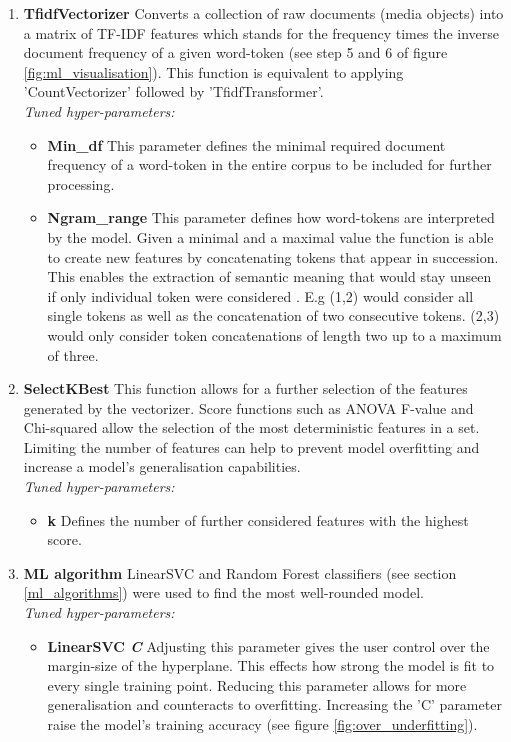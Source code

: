 \begin{enumerate}
    \item \textbf{TfidfVectorizer} Converts a collection of raw documents (media objects) into a matrix of TF-IDF features which stands for the frequency times the inverse document frequency of a given word-token (see step 5 and 6 of figure \ref{fig:ml_visualisation}). This function is equivalent to applying 'CountVectorizer' followed by 'TfidfTransformer'.\\
    \textit{Tuned hyper-parameters:}
    \begin{itemize}[label={}]
        \item \textbf{Min\_df} This parameter defines the minimal required document frequency of a word-token in the entire corpus to be included for further processing.
        \item \textbf{Ngram\_range} This parameter defines how word-tokens are interpreted by the model. Given a minimal and a maximal value the function is able to create new features by concatenating tokens that appear in succession. This enables the extraction of semantic meaning that would stay unseen if only individual token were considered \parencite{Surtikanti2013}. E.g (1,2) would consider all single tokens as well as the concatenation of two consecutive tokens. (2,3) would only consider token concatenations of length two up to a maximum of three.
    \end{itemize}
    
    \item \textbf{SelectKBest} This function allows for a further selection of the features generated by the vectorizer. Score functions such as ANOVA F-value and Chi-squared allow the selection of the most deterministic features in a set. Limiting the number of features can help to prevent model overfitting and increase a model's generalisation capabilities.\\
    \textit{Tuned hyper-parameters:}
    \begin{itemize}[label={}]
        \item \textbf{k} Defines the number of further considered features with the highest score.
    \end{itemize}
    
    \item \textbf{ML algorithm} LinearSVC and Random Forest classifiers (see section \ref{ml_algorithms}) were used to find the most well-rounded model.\\
    \textit{Tuned hyper-parameters:}
    \begin{itemize}[label={}]
        \item \textbf{LinearSVC \textit{C}} Adjusting this parameter gives the user control over the margin-size of the hyperplane. This effects how strong the model is fit to every single training point. Reducing this parameter allows for more generalisation and counteracts to overfitting. Increasing the 'C' parameter raise the model's training accuracy (see figure \ref{fig:over_underfitting}).
        

\end{itemize}
\end{enumerate}
